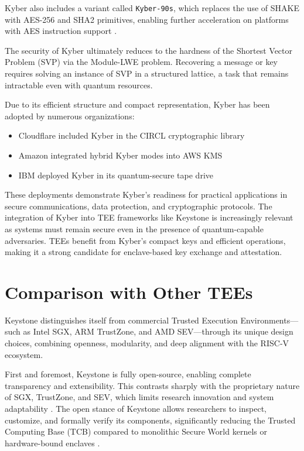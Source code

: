 Kyber also includes a variant called \texttt{Kyber-90s}, which replaces the use of SHAKE with AES-256 and SHA2 primitives, enabling further acceleration on platforms with AES instruction support \cite{kyber2024}. %

The security of Kyber ultimately reduces to the hardness of the Shortest Vector Problem (SVP) via the Module-LWE problem. Recovering a message or key requires solving an instance of SVP in a structured lattice, a task that remains intractable even with quantum resources\cite{kyber2021}. %

Due to its efficient structure and compact representation, Kyber has been adopted by numerous organizations:
\begin{itemize}
    \item Cloudflare included Kyber in the CIRCL cryptographic library
    \item Amazon integrated hybrid Kyber modes into AWS KMS
    \item IBM deployed Kyber in its quantum-secure tape drive
\end{itemize} %
These deployments demonstrate Kyber’s readiness for practical applications in secure communications, data protection, and cryptographic protocols. 
The integration of Kyber into TEE frameworks like Keystone is increasingly relevant as systems must remain secure even in the presence of quantum-capable adversaries. TEEs benefit from Kyber’s compact keys and efficient operations, making it a strong candidate for enclave-based key exchange and attestation.

\section{Comparison with Other TEEs}
\label{sec:comparison_tees}

Keystone distinguishes itself from commercial Trusted Execution Environments—such as Intel SGX, ARM TrustZone, and AMD SEV—through its unique design choices, combining openness, modularity, and deep alignment with the RISC‑V ecosystem.

First and foremost, Keystone is fully open-source, enabling complete transparency and extensibility. This contrasts sharply with the proprietary nature of SGX, TrustZone, and SEV, which limits research innovation and system adaptability \cite{turn0search0}. The open stance of Keystone allows researchers to inspect, customize, and formally verify its components, significantly reducing the Trusted Computing Base (TCB) compared to monolithic Secure World kernels or hardware-bound enclaves \cite{turn0search0}.

